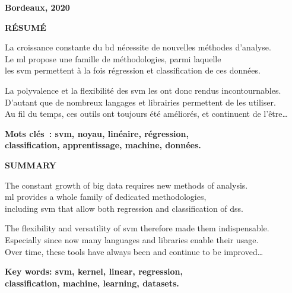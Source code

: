 {}

\cnam

\begin{large}\fulltitle\end{large}

\textbf{\goal}

\textbf{Bordeaux, 2020}

\hr

\textbf{RÉSUMÉ}

La croissance constante du \gls{bd} nécessite de nouvelles méthodes d’analyse.\\
Le \gls{ml} propose une famille de méthodologies, parmi laquelle\\
les \gls{svm} permettent à la fois régression et classification de ces données.

La polyvalence et la flexibilité des \gls{svm} les ont donc rendus incontournables.\\
D’autant que de nombreux langages et librairies permettent de les utiliser.\\
Au fil du temps, ces outils ont toujours été améliorés, et continuent de l’être…

\textbf{Mots clés : svm, noyau, linéaire, régression,\\
classification, apprentissage, machine, données.}

\hr

\textbf{SUMMARY}

The constant growth of big data requires new methods of analysis.\\
\Gls{ml} provides a whole family of dedicated methodologies,\\
including \gls{svm} that allow both regression and classification of \glspl{ds}.

The flexibility and versatility of \gls{svm} therefore made them indispensable.\\
Especially since now many languages and libraries enable their usage.\\
Over time, these tools have always been and continue to be improved…

\textbf{Key words: svm, kernel, linear, regression,\\
classification, machine, learning, datasets.}

\thispagestyle{empty}

\pagebreak
